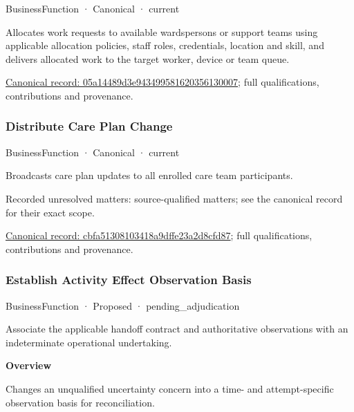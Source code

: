 \label{element:05a14489d3e943499581620356130007}
{\small BusinessFunction · Canonical · current}\par

Allocates work requests to available wardspersons or support teams using applicable allocation policies, staff roles, credentials, location and skill, and delivers allocated work to the target worker, device or team queue.


{\footnotesize \href{../../../../continuum/business/business-function/05a14489d3e943499581620356130007.md}{Canonical record: 05a14489d3e943499581620356130007}; full qualifications, contributions and provenance.}\par
\subsubsection{Distribute Care Plan Change}

\label{element:cbfa51308103418a9dffe23a2d8cfd87}
{\small BusinessFunction · Canonical · current}\par

Broadcasts care plan updates to all enrolled care team participants.


{\small Recorded unresolved matters: source-qualified matters; see the canonical record for their exact scope.}\par
{\footnotesize \href{../../../../continuum/business/business-function/cbfa51308103418a9dffe23a2d8cfd87.md}{Canonical record: cbfa51308103418a9dffe23a2d8cfd87}; full qualifications, contributions and provenance.}\par
\subsubsection{Establish Activity Effect Observation Basis}

\label{element:4038dd6a1baa4856afc76d7adfa6a457}
{\small BusinessFunction · Proposed · pending\_adjudication}\par

Associate the applicable handoff contract and authoritative observations with an indeterminate operational undertaking.



\textbf{Overview}



Changes an unqualified uncertainty concern into a time- and attempt-specific observation basis for reconciliation.



